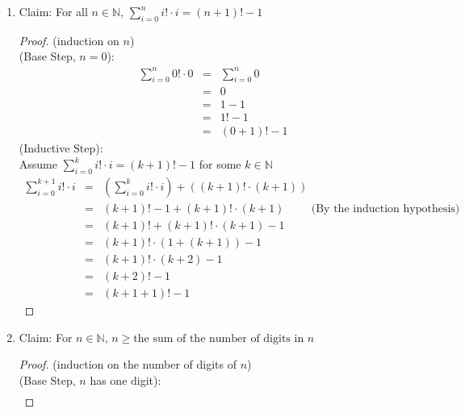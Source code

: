 \documentclass{article}
\begin{document}
\begin{enumerate}
\begin{enumerate}
\begin{proof}
\begin{eqnarray}
                &=& 2^k + 2^k - 1 \\
                &=& 2 \cdot 2^k - 1 \\
                &=& 2^{k+1} - 1
            \end{eqnarray}
        \end{proof}
        \item Claim: For all $n \in \mathbb{N}$, $\sum\limits_{i=0}^{n}{i! \cdot i} = (n+1)! - 1$
        \begin{proof}
            (induction on $n$) \\
            (Base Step, $n=0$):
            \begin{eqnarray}
                \sum\limits_{i=0}^{n}{0! \cdot 0} &=& \sum\limits_{i=0}^{n}{0} \\
                &=& 0 \\
                &=& 1 - 1 \\
                &=& 1! - 1 \\
                &=& (0+1)! - 1
            \end{eqnarray}
            (Inductive Step): \\
            Assume $\sum\limits_{i=0}^{k}{i! \cdot i} = (k+1)! - 1$ for some $k \in \mathbb{N}$
            \begin{eqnarray}
                \sum\limits_{i=0}^{k+1}{i! \cdot i} &=& (\sum\limits_{i=0}^{k}{i! \cdot i}) + ((k+1)! \cdot (k+1)) \\
                &=& (k+1)! - 1 + (k+1)! \cdot (k+1) \hspace{1cm} \text{(By the induction hypothesis)} \\
                &=& (k+1)! + (k+1)! \cdot (k+1) - 1 \\
                &=& (k+1)! \cdot (1 + (k+1)) - 1 \\
                &=& (k+1)! \cdot (k+2) - 1 \\
                &=& (k+2)! - 1 \\
                &=& (k+1+1)! - 1
            \end{eqnarray}
        \end{proof}
        \item Claim: For $n \in \mathbb{N}$, $n \geq \text{the sum of the number of digits in } n$
        \begin{proof}
            (induction on the number of digits of $n$) \\
            (Base Step, $n$ has one digit):
            \begin{eqnarray}

\end{eqnarray}
\end{proof}
\end{enumerate}
\end{enumerate}
\end{document}
